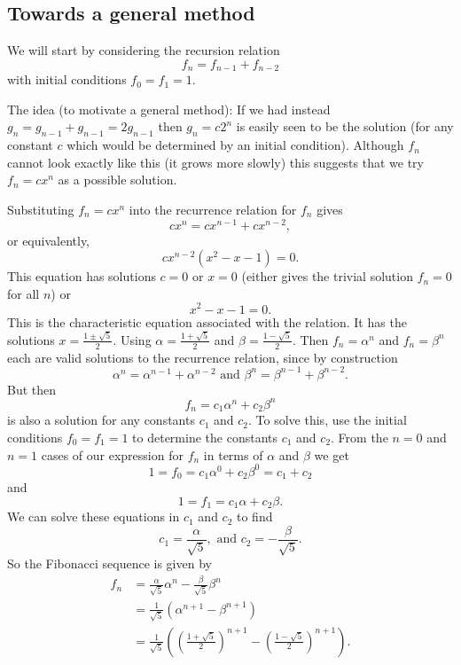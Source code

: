 \documentclass[10pt, a4paper]{article}
\begin{document}
\subsection{Towards a general method}
We will start by considering the recursion relation
\[
f_n = f_{n - 1} + f_{n - 2}
\]
with initial conditions $f_0 = f_1 = 1$.

The idea (to motivate a general method):
If we had instead $g_n = g_{n - 1} + g_{n - 1} = 2g_{n - 1}$ then $g_n = c2 ^ n$ is easily seen to be the solution
(for any constant $c$ which would be determined by an initial condition).
Although $f_n$ cannot look exactly like this
(it grows more slowly)
this suggests that we try $f_n = cx ^ n$ as a possible solution.

Substituting $f_n = cx ^ n$ into the recurrence relation for $f_n$ gives
\[
cx ^ n = cx ^ {n - 1} + cx ^ {n - 2},
\]
or equivalently,
\[
cx ^ {n - 2}(x ^ 2 - x - 1) = 0.
\]
This equation has solutions $c = 0$ or $x = 0$
(either gives the trivial solution $f_n = 0$ for all $n$)
or
\[
x ^ 2 - x - 1 = 0.
\]
This is the characteristic equation associated with the relation.
It has the solutions $x = \frac{1 \pm \sqrt{5}}{2}$.
Using $\alpha = \frac{1 + \sqrt{5}}{2}$ and $\beta = \frac{1 - \sqrt{5}}{2}$.
Then $f_n = \alpha ^ n$ and $f_n = \beta ^ n$ each are valid solutions to the recurrence relation,
since by construction
\[
\alpha ^ n = \alpha ^ {n - 1} + \alpha ^ {n - 2}\text{ and } \beta ^ n = \beta ^ {n - 1} + \beta ^ {n - 2}.
\]
But then
\[
f_n = c_1\alpha ^ n + c_2\beta ^ n
\]
is also a solution for any constants $c_1$ and $c_2$.
To solve this,
use the initial conditions $f_0 = f_1 = 1$ to determine the constants $c_1$ and $c_2$.
From the $n = 0$ and $n = 1$ cases of our expression for $f_n$ in terms of $\alpha$ and $\beta$ we get
\[
1 = f_0 = c_1 \alpha ^ 0 + c_2 \beta ^ 0 = c_1 + c_2
\]
and
\[
1 = f_1 = c_1\alpha + c_2\beta.
\]
We can solve these equations in $c_1$ and $c_2$ to find
\[
c_1 = \frac{\alpha}{\sqrt{5}},\text{ and } c_2 = -\frac{\beta}{\sqrt{5}}.
\]
So the Fibonacci sequence is given by
\begin{align*}
    f_n &= \frac{\alpha}{\sqrt{5}}\alpha ^ n - \frac{\beta}{\sqrt{5}}\beta ^ n \\
    &= \frac{1}{\sqrt{5}}(\alpha ^ {n + 1} - \beta ^ {n + 1}) \\
    &= \frac{1}{\sqrt{5}}\left(\left(\frac{1 + \sqrt{5}}{2}\right) ^ {n + 1} - \left(\frac{1 - \sqrt{5}}{2}\right) ^ {n + 1}\right).
\end{align*}
\end{document}
